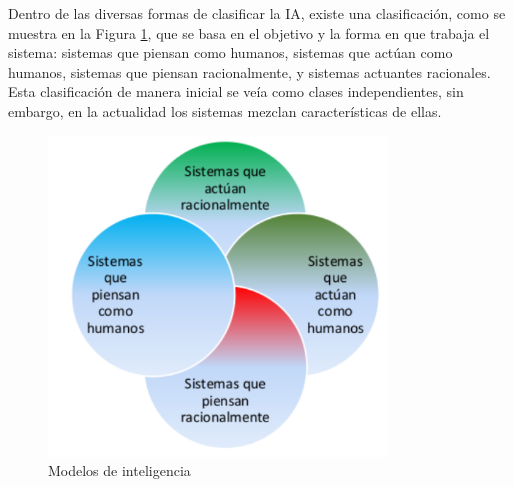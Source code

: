 
Dentro de las diversas formas de clasificar la IA, existe una clasificación, como se muestra en la Figura \ref{fig:ModelosInteligencia}, que se basa en el objetivo y la forma en que trabaja el sistema: sistemas que piensan como humanos, sistemas que actúan como humanos, sistemas que piensan racionalmente, y sistemas actuantes racionales. Esta clasificación de manera inicial se veía como clases independientes, sin embargo, en la actualidad los sistemas mezclan características de ellas. \cite{Ponce14} \\

\begin{figure} [H]
    \begin{center}
      \includegraphics[width=9cm]{figs/Modelos de inteligencia.png}
    \end{center}
    \caption{Modelos de inteligencia}
    \label{fig:ModelosInteligencia}
\end{figure}


